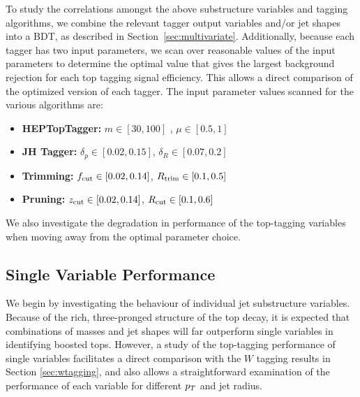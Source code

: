 To study the correlations amongst the above substructure variables and tagging algorithms,
we combine the relevant tagger output variables and/or jet shapes into a BDT, as described in Section~\ref{sec:multivariate}. Additionally, because each tagger has two input parameters, we scan over reasonable values of the input parameters to determine the optimal value that gives the largest background rejection for each top tagging signal efficiency. This allows a direct comparison of the optimized version of each tagger. The input parameter values scanned for the various algorithms are:
%
\begin{itemize}
\item {\bf HEPTopTagger:} $m\in[30,100]$ \GeV, $\mu\in[0.5,1]$
\item {\bf JH Tagger:} $\delta_p\in[0.02,0.15]$, $\delta_R\in[0.07,0.2]$
\item {\bf Trimming:} $f_{\rm cut}\in[0.02,0.14]$, $R_{\rm trim}\in[0.1,0.5]$
\item {\bf Pruning:} $z_{\rm cut}\in[0.02,0.14]$, $R_{\rm cut}\in[0.1,0.6]$
\end{itemize}
%
We also investigate the degradation in performance of the top-tagging variables when moving away from the optimal parameter choice.

\subsection{Single Variable Performance}\label{sec:single_variable}
We begin by investigating the behaviour of individual jet substructure variables. Because of the rich, three-pronged structure of the top decay, it is expected that combinations of masses and jet shapes will far outperform single variables in identifying boosted tops. However, a study of the top-tagging performance of single variables facilitates a direct comparison with the $W$ tagging results in Section \ref{sec:wtagging}, and also allows a straightforward examination of the performance of each variable for different $p_T$ and jet radius.

